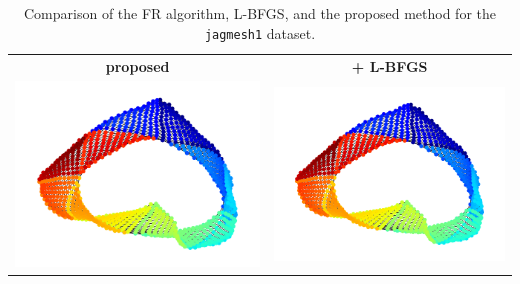 \documentclass[dvipdfmx,journal]{IEEEtran}
\begin{document}
\begin{table}[t]
\begin{tabular}{cc}
    \large{\textbf{proposed}}                                    & \large{\textbf{+ L-BFGS}} \\
    \begin{minipage}{0.45\columnwidth}
      \centering
      \includegraphics[width=\columnwidth]{jagmesh1_LBFGS_50iter.png}
    \end{minipage}
                                                                 &
    \begin{minipage}{0.45\columnwidth}
      \centering
      \includegraphics[width=\columnwidth]{jagmesh1_LBFGS_50iter.png}
    \end{minipage}
  \end{tabular}
  \caption{
    Comparison of the FR algorithm, L-BFGS, and the proposed method
    for the \texttt{jagmesh1} dataset.}
  \label{table:four_images}
\end{table}
\end{document}
